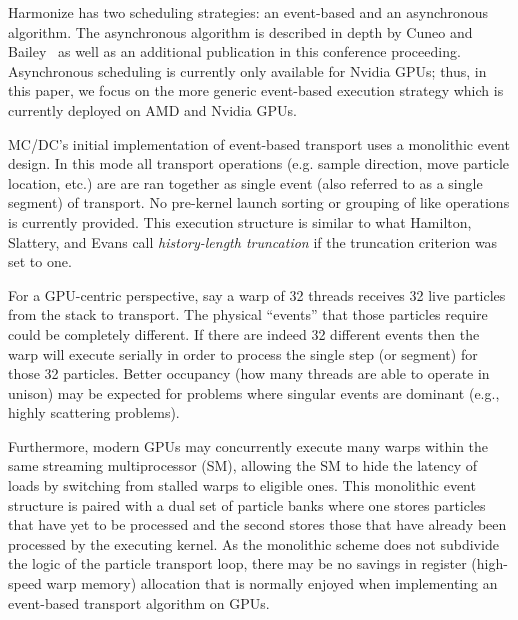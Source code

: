 Harmonize has two scheduling strategies: an event-based and an asynchronous algorithm.
The asynchronous algorithm is described in depth by Cuneo and Bailey~\cite{brax2023} as well as an additional publication in this conference proceeding.
Asynchronous scheduling is currently only available for Nvidia GPUs; thus, in this paper, we focus on the more generic event-based execution strategy which is currently deployed on AMD and Nvidia GPUs.

MC/DC's initial implementation of event-based transport uses a monolithic event design.
In this mode all transport operations (e.g. sample direction, move particle location, etc.) are are ran together as single event (also referred to as a single segment) of transport.
No pre-kernel launch sorting or grouping of like operations is currently provided.
This execution structure is similar to what Hamilton, Slattery, and Evans call \textit{history-length truncation} \cite{hamilton_multigroup_2018} if the truncation criterion was set to one.

For a GPU-centric perspective, say a warp of 32 threads receives 32 live particles from the stack to transport.
The physical ``events'' that those particles require could be completely different.
If there are indeed 32 different events then the warp will execute serially in order to process the single step (or segment) for those 32 particles.
Better occupancy (how many threads are able to operate in unison) may be expected for problems where singular events are dominant (e.g., highly scattering problems).

Furthermore, modern GPUs may concurrently execute many warps within the same streaming multiprocessor (SM), allowing the SM to hide the latency of loads by switching from stalled warps to eligible ones.
This monolithic event structure is paired with a dual set of particle banks where one stores particles that have yet to be processed and the second stores those that have already been processed by the executing kernel.
As the monolithic scheme does not subdivide the logic of the particle transport loop, there may be no savings in register (high-speed warp memory) allocation that is normally enjoyed when implementing an event-based transport algorithm on GPUs.



